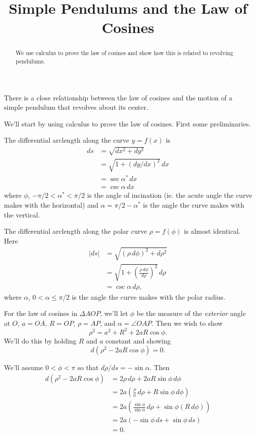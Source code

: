 \documentclass{ximera}
\title{Simple Pendulums and the Law of Cosines}
\begin{document}
\begin{abstract}
We use calculus to prove the law of cosines and show how this is related to revolving pendulums.
\end{abstract}
\maketitle

There is a close relationship between the law of cosines and the motion of a simple pendulum that revolves about its center.

We'll start by using calculus to prove the law of cosines. First some preliminaries.

The differential arclength along the curve $y=f(x)$ is
\begin{align*}
   ds   &= \sqrt{dx^2 + dy^2} \\
         & = \sqrt{1+\left( dy/dx  \right)^2} \, dx \\
         &= \sec\alpha^* \, dx \\
         &= \csc \alpha \, dx
\end{align*}
where $\phi$, $-\pi/2 < \alpha^* <\pi/2$ is the angle of incination (ie. the acute angle the curve makes with the horizontal) and $\alpha = \pi/2 - \alpha^*$ is the angle the curve makes with the vertical.

The differential arclength along the polar curve $\rho = f(\phi)$ is almost identical. Here
\begin{align*}
   |ds|   &= \sqrt{(\rho \, d\phi)^2 + d\rho^2} \\
         & = \sqrt{1 + \left( \frac{\rho\, d\phi}{d\rho}\right)^2} \, d\rho \\
         &= \csc \alpha \, d\rho ,
\end{align*}
where $\alpha$, $0<\alpha \leq \pi/2$ is the angle the curve makes with the polar radius.

For the law of cosines in $\Delta AOP$, we'll let $\phi$ be the measure of the \emph{exterior} angle at $O$, $a=OA$, $R = OP$, $\rho = AP$, and $\alpha = \angle OAP$. Then we wish to show
\[
        \rho^2 = a^2 + R^2 + 2aR\cos\phi .
\]
We'll do this by holding $R$ and $a$ constant and showing
\[
  d \left(   \rho^2 - 2aR\cos\phi  \right) = 0 .
\]

We'll assume $0<\phi <\pi$ so that $d\rho/ds = -\sin\alpha$. Then %
\begin{align*}
  d \left(   \rho^2 - 2aR\cos\phi  \right)  &= 2\rho \, d\rho+ 2aR\sin\phi \, d\phi \\
                              &=2a \left(  \frac{\rho}{a} \, d\rho   + R\sin\phi \, d\phi \right) \\
                              &= 2a \left(  \frac{\sin\phi}{\sin\alpha}\,  d\rho  + \sin\phi (R\, d\phi)  \right)\\
                              &= 2a \left(  -\sin\phi \,  ds  +  \sin\phi \, ds   \right)\\
                              &= 0 .
\end{align*}
\end{document}
